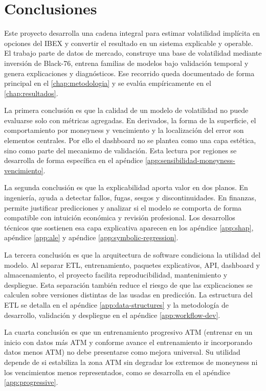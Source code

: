 
\chapter{Conclusiones}
\label{chap:conclusiones}

Este proyecto desarrolla una cadena integral para estimar volatilidad implícita en opciones del IBEX y convertir el resultado en un sistema explicable y operable. El trabajo parte de datos de mercado, construye una base de volatilidad mediante inversión de Black-76, entrena familias de modelos bajo validación temporal y genera explicaciones y diagnósticos. Ese recorrido queda documentado de forma principal en el \autoref{chap:metodologia} y se evalúa empíricamente en el \autoref{chap:resultados}.

La primera conclusión es que la calidad de un modelo de volatilidad no puede evaluarse solo con métricas agregadas. En derivados, la forma de la superficie, el comportamiento por moneyness y vencimiento y la localización del error son elementos centrales. Por ello el dashboard no se plantea como una capa estética, sino como parte del mecanismo de validación. Esta lectura por regiones se desarrolla de forma específica en el apéndice \ref{app:sensibilidad-moneyness-vencimiento}.

La segunda conclusión es que la explicabilidad aporta valor en dos planos. En ingeniería, ayuda a detectar fallos, fugas, sesgos y discontinuidades. En finanzas, permite justificar predicciones y analizar si el modelo se comporta de forma compatible con intuición económica y revisión profesional. Los desarrollos técnicos que sostienen esa capa explicativa aparecen en los apéndice \ref{app:shap}, apéndice \ref{app:ale} y apéndice \ref{app:symbolic-regression}.

La tercera conclusión es que la arquitectura de software condiciona la utilidad del modelo. Al separar ETL, entrenamiento, paquetes explicativos, API, dashboard y almacenamiento, el proyecto facilita reproducibilidad, mantenimiento y despliegue. Esta separación también reduce el riesgo de que las explicaciones se calculen sobre versiones distintas de las usadas en predicción. La estructura del ETL se detalla en el apéndice \ref{app:data-structures} y la metodología de desarrollo, validación y despliegue en el apéndice \ref{app:workflow-dev}.

La cuarta conclusión es que un entrenamiento progresivo ATM (entrenar en un inicio con datos más ATM y conforme avance el entrenamiento ir incorporando datos menos ATM) no debe presentarse como mejora universal. Su utilidad depende de si estabiliza la zona ATM sin degradar los extremos de moneyness ni los vencimientos menos representados, como se desarrolla en el apéndice \ref{app:progressive}.

